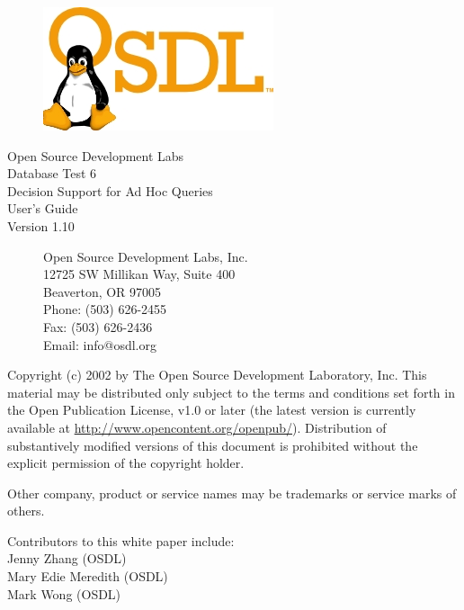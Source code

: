 \documentclass{article}
\begin{document}
\begin{titlepage}

  \begin{figure}[t]
    \centering
    \includegraphics[scale=1]{osdl-logo.png}
  \end{figure}

  \centering
  \huge
  Open Source Development Labs \\
  Database Test 6 \\
  Decision Support for Ad Hoc Queries \\
  \huge
  User's Guide \\
  \large
  Version 1.10

  \begin{figure}[b]
    \flushleft
    \normalsize
    Open Source Development Labs, Inc. \\
    12725 SW Millikan Way, Suite 400 \\
    Beaverton, OR 97005 \\
    Phone: (503) 626-2455 \\
    Fax: (503) 626-2436 \\
    Email: info@osdl.org
  \end{figure}

\end{titlepage}

\noindent
Copyright (c) 2002 by The Open Source Development Laboratory, Inc. This
material may be distributed only subject to the terms and conditions set forth
in the Open Publication License, v1.0 or later (the latest version is currently
available at \url{http://www.opencontent.org/openpub/}). Distribution of
substantively modified versions of this document is prohibited without the
explicit permission of the copyright holder.

\noindent
Other company, product or service names may be trademarks or service marks of
others.

\noindent
Contributors to this white paper include: \\
\indent Jenny Zhang (OSDL) \\
\indent Mary Edie Meredith (OSDL) \\
\indent Mark Wong (OSDL) \\
\end{document}
